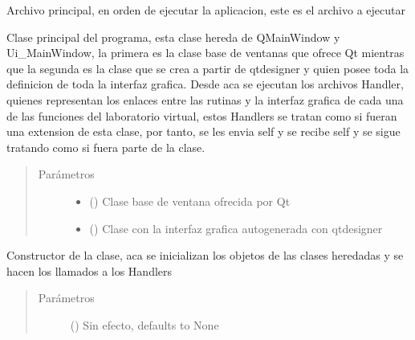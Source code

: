 \documentclass[letterpaper,10pt,spanish]{sphinxmanual}
\begin{document}
\label{\detokenize{codigos/Principal:module-main}}
Archivo principal, en orden de ejecutar la aplicacion, este es el archivo a ejecutar

\begin{fulllineitems}
\label{\detokenize{codigos/Principal:main.MainWindow}}
Clase principal del programa, esta clase hereda de QMainWindow y Ui\_MainWindow, la primera es la clase base de ventanas que ofrece Qt mientras que la segunda es la clase que se crea a partir de qtdesigner y quien posee toda la definicion de toda la interfaz grafica. Desde aca se ejecutan los archivos Handler, quienes representan los enlaces entre las rutinas y la interfaz grafica de cada una de las funciones del laboratorio virtual, estos Handlers se tratan como si fueran una extension de esta clase, por tanto, se les envia self y se recibe self y se sigue tratando como si fuera parte de la clase.
\begin{quote}\begin{description}
\item[{Parámetros}] \leavevmode\begin{itemize}
\item {} 
 () \textendash{} Clase base de ventana ofrecida por Qt

\item {} 
 () \textendash{} Clase con la interfaz grafica autogenerada con qtdesigner

\end{itemize}

\end{description}\end{quote}

\begin{fulllineitems}
\label{\detokenize{codigos/Principal:main.MainWindow.__init__}}
Constructor de la clase, aca se inicializan los objetos de las clases heredadas y se hacen los llamados a los Handlers
\begin{quote}\begin{description}
\item[{Parámetros}] \leavevmode
{} (\sphinxstyleliteralemphasis{\sphinxupquote{, }}) \textendash{} Sin efecto, defaults to None


\end{description}
\end{quote}
\end{fulllineitems}
\end{fulllineitems}
\end{document}
